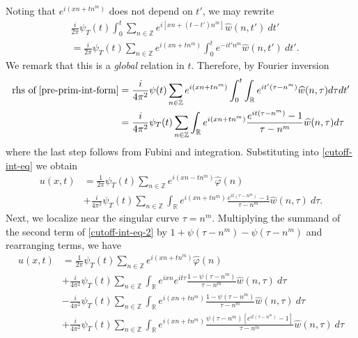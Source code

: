 \documentclass[12pt,reqno]{amsart}
\numberwithin{equation}{section}  %
\numberwithin{figure}{section}
\newcommand{\rr}{\mathbb{R}}
\newcommand{\zz}{\mathbb{Z}}
\newcommand{\wh}{\widehat}
\newcommand{\vp}{\varphi}
\theoremstyle{plain}
\theoremstyle{definition}
\theoremstyle{remark}
\begin{document}
%
%
Noting that $e^{i\left( xn + tn^{m } \right)}$ 
does not depend on $t'$, we may rewrite
%
%
\begin{equation}
	\label{pre-prim-int-form}
	\begin{split}
		& \frac{i }{2 \pi} \psi_{T}(t) \int_0^t \sum_{n \in \zz} 
		e^{i\left[ xn + (t - t') n^m \right]} \wh{w}(n, t') \ dt'
		\\
		& = \frac{i}{2 \pi} \psi_{T}(t) \sum_{n \in \zz} e^{i\left( xn + t 
		 n^{m } 
		\right)} \int_0^t e^{- it'n^{m }} \wh{w}(n, t') \ dt'.
	\end{split}
\end{equation}
We remark that this is a \emph{global} relation in $t$. Therefore, by Fourier 
inversion
%
%
%
%
%
%
%
\begin{equation*}
	\begin{split}
		\text{rhs of} \; \eqref{pre-prim-int-form}
		& = \frac{i}{4 \pi^2} \psi (t) \sum_{n \in \zz} e^{i\left( xn + t 
		 n^m
		\right)} \int_0^t \int_\rr e^{it'\left( \tau - n^m \right) }
		\wh{w}(n, \tau) d \tau dt'
		\\
		& = \frac{i}{4 \pi^2} \psi_{T}(t) \sum_{n \in \zz} \int_\rr 
		e^{i\left( xn + tn^m \right)} \frac{e^{it\left( \tau - n^m 
		\right)}-1}{\tau - n^m} \wh{w}(n, \tau) d \tau
	\end{split}
\end{equation*}
%
%
where the last step follows from Fubini and integration. Substituting
into \eqref{cutoff-int-eq} we obtain
%
%
\begin{equation}
	\begin{split}
		\label{cutoff-int-eq-2}
		u(x, t)
		& = \frac{1}{2 \pi} \psi_{T}(t) \sum_{n \in \zz} e^{i(xn - tn^{m })} \widehat{\vp}(n) 
		\\
		& + \frac{i}{4 \pi^2} \psi_{T}(t) \sum_{n \in \zz} \int_\rr
		e^{i(xn + t n^m)} \frac{e^{it(\tau - n^m)}- 1}{\tau - n^m} 
		\wh{w}(n, \tau) \ d \tau.
	\end{split}
\end{equation}
%
%
%
%
%
Next, we localize near the singular curve $\tau =  n^m$.  Multiplying the
summand of the second term of \eqref{cutoff-int-eq-2} by $1 + \psi(\tau -
n^m) - \psi(\tau -
n^m) $ and
rearranging terms, we have
%
%
\begin{equation*}
	\begin{split}
		 u(x, t)
		& = \frac{1}{2 \pi} \psi_{T}(t) \sum_{n \in \zz} e^{i(xn + t n^{m 
		})} \widehat{\vp}(n) 
		\\
		& + \frac{i}{4 \pi^2} \psi_{T}(t) \sum_{n \in \zz} \int_\rr e^{ixn}  
		e^{it \tau} \frac{ 1 - \psi(\tau - n^m) 
		}{\tau - n^m} \wh{w}(n, \tau) \ d \tau
		\\
		& - \frac{i}{4 \pi^2} \psi_{T}(t) \sum_{n \in \zz} \int _\rr e^{i(xn + 
		t n^m)}
		 \frac{1- \psi(\tau - n^m)}{\tau - n^m} \wh{w}(n, \tau) \ d \tau
		\\
		& + \frac{i}{4 \pi^2} \psi_{T}(t) \sum_{n \in \zz} \int_\rr
		e^{i(xn + t n^m)}
		\frac{\psi(\tau - n^m)\left[ e^{it(\tau - n^m)}-1 
		\right]}{\tau - n^m} \wh{w}(n, \tau) \ d \tau
	\end{split}
\end{equation*}
\end{document}
